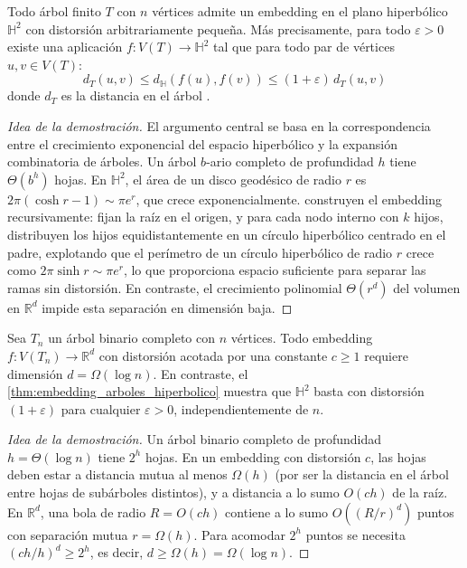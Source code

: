 \begin{theorem}\label{thm:embedding_arboles_hiperbolico}
Todo árbol finito $T$ con $n$ vértices admite un embedding en el plano hiperbólico $\mathbb{H}^2$ con distorsión arbitrariamente pequeña. Más precisamente, para todo $\varepsilon > 0$ existe una aplicación $f: V(T) \to \mathbb{H}^2$ tal que para todo par de vértices $u, v \in V(T)$:
\begin{equation}
    d_T(u,v) \leq d_{\mathbb{H}}(f(u), f(v)) \leq (1+\varepsilon)\, d_T(u,v)
\end{equation}
donde $d_T$ es la distancia en el árbol \citep{sarkar2011low}.
\end{theorem}

\begin{proof}[Idea de la demostración]
El argumento central se basa en la correspondencia entre el crecimiento exponencial del espacio hiperbólico y la expansión combinatoria de árboles. Un árbol $b$-ario completo de profundidad $h$ tiene $\Theta(b^h)$ hojas. En $\mathbb{H}^2$, el área de un disco geodésico de radio $r$ es $2\pi(\cosh r - 1) \sim \pi e^r$, que crece exponencialmente. \citet{sarkar2011low} construyen el embedding recursivamente: fijan la raíz en el origen, y para cada nodo interno con $k$ hijos, distribuyen los hijos equidistantemente en un círculo hiperbólico centrado en el padre, explotando que el perímetro de un círculo hiperbólico de radio $r$ crece como $2\pi \sinh r \sim \pi e^r$, lo que proporciona espacio suficiente para separar las ramas sin distorsión. En contraste, el crecimiento polinomial $\Theta(r^d)$ del volumen en $\mathbb{R}^d$ impide esta separación en dimensión baja.
\end{proof}

\begin{proposition}\label{prop:cota_inferior_euclidiano}
Sea $T_n$ un árbol binario completo con $n$ vértices. Todo embedding $f: V(T_n) \to \mathbb{R}^d$ con distorsión acotada por una constante $c \geq 1$ requiere dimensión $d = \Omega(\log n)$. En contraste, el \autoref{thm:embedding_arboles_hiperbolico} muestra que $\mathbb{H}^2$ basta con distorsión $(1+\varepsilon)$ para cualquier $\varepsilon > 0$, independientemente de $n$.
\end{proposition}

\begin{proof}[Idea de la demostración]
Un árbol binario completo de profundidad $h = \Theta(\log n)$ tiene $2^h$ hojas. En un embedding con distorsión $c$, las hojas deben estar a distancia mutua al menos $\Omega(h)$ (por ser la distancia en el árbol entre hojas de subárboles distintos), y a distancia a lo sumo $O(ch)$ de la raíz. En $\mathbb{R}^d$, una bola de radio $R = O(ch)$ contiene a lo sumo $O((R/r)^d)$ puntos con separación mutua $r = \Omega(h)$. Para acomodar $2^h$ puntos se necesita $(ch/h)^d \geq 2^h$, es decir, $d \geq \Omega(h) = \Omega(\log n)$.
\end{proof}

